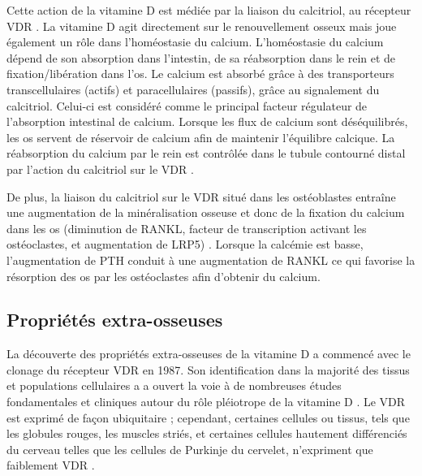\documentclass[
  a4paper,
  DIV=11,
  numbers=noendperiod,
  listof=totoc]{scrreprt}
\begin{document}
Cette action de la vitamine D est médiée par la liaison du calcitriol,
au récepteur \ac{VDR} \autocite{Norman.2008,Dankers.2017}. La vitamine D
agit directement sur le renouvellement osseux mais joue également un
rôle dans l'homéostasie du calcium. L'homéostasie du calcium dépend de
son absorption dans l'intestin, de sa réabsorption dans le rein et de
fixation/libération dans l'os. Le calcium est absorbé grâce à des
transporteurs transcellulaires (actifs) et paracellulaires (passifs),
grâce au signalement du calcitriol. Celui-ci est considéré comme le
principal facteur régulateur de l'absorption intestinal de calcium.
Lorsque les flux de calcium sont déséquilibrés, les os servent de
réservoir de calcium afin de maintenir l'équilibre calcique. La
réabsorption du calcium par le rein est contrôlée dans le tubule
contourné distal par l'action du calcitriol sur le \ac{VDR}
\autocite{Carmeliet.2015}.

De plus, la liaison du calcitriol sur le VDR situé dans les ostéoblastes
entraîne une augmentation de la minéralisation osseuse et donc de la
fixation du calcium dans les os (diminution de RANKL, facteur de
transcription activant les ostéoclastes, et augmentation de LRP5)
\autocite{Carmeliet.2015}. Lorsque la calcémie est basse, l'augmentation
de \ac{PTH} conduit à une augmentation de RANKL ce qui favorise la
résorption des os par les ostéoclastes afin d'obtenir du calcium.

\hypertarget{propriuxe9tuxe9s-extra-osseuses}{%
\subsection{Propriétés
extra-osseuses}\label{propriuxe9tuxe9s-extra-osseuses}}

La découverte des propriétés extra-osseuses de la vitamine D a commencé
avec le clonage du récepteur \ac{VDR} en 1987. Son identification dans
la majorité des tissus et populations cellulaires a a ouvert la voie à
de nombreuses études fondamentales et cliniques autour du rôle
pléiotrope de la vitamine D \autocite{Rosen.2012}. Le \ac{VDR} est
exprimé de façon ubiquitaire ; cependant, certaines cellules ou tissus,
tels que les globules rouges, les muscles striés, et certaines cellules
hautement différenciés du cerveau telles que les cellules de Purkinje du
cervelet, n'expriment que faiblement \ac{VDR} \autocite{Bouillon.2008}.
\end{document}
